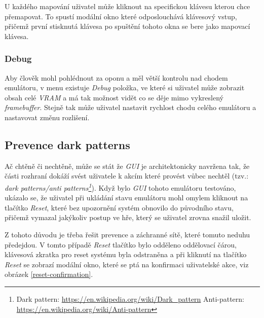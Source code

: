 U každého mapování uživatel může kliknout na specifickou klávesu kterou chce přemapovat.
To spustí modální okno které odposlouchává klávesový vstup, přičemž první stisknutá klávesa
po spuštění tohoto okna se bere jako mapovací klávesa. 

\subsubsection{Debug}

Aby člověk mohl pohlédnout za oponu a měl větší kontrolu nad chodem emulátoru, v menu existuje \textit{Debug} položka, ve které
si uživatel může zobrazit obsah celé \textit{VRAM} a má tak možnost vidět co se děje mimo vykreslený \textit{framebuffer}.
Stejně tak může uživatel nastavit rychlost chodu celého emulátoru a nastavovat změnu rozlišení.

\subsection{Prevence dark patterns}

Ač chtěně či nechtěně, může se stát že \textit{GUI} je architektonicky navržena tak, že části rozhraní dokáží svést uživatele k akcím
které provést vůbec nechtěl (tzv.: \textit{dark patterns/anti patterns\footnote{Dark pattern: \url{https://en.wikipedia.org/wiki/Dark_pattern} \newline Anti-pattern: \url{https://en.wikipedia.org/wiki/Anti-pattern}}}). Když bylo \textit{GUI} tohoto emulátoru testováno, ukázalo se, že uživatel při ukládání stavu emulátoru
mohl omylem kliknout na tlačítko \textit{Reset}, které bez upozornění systém obnovilo do původního stavu, přičemž vymazal jakýkoliv postup ve
hře, který se uživatel zrovna snažil uložit.

Z tohoto důvodu je třeba řešit prevence a záchranné sítě, které tomuto neduhu předejdou. V tomto případě \textit{Reset} tlačítko bylo odděleno oddělovací čárou,
klávesová zkratka pro reset systému byla odstraněna a při kliknutí na tlačítko \textit{Reset} se zobrazí modální okno, které se ptá na konfirmaci
uživatelské akce, viz obrázek \ref{reset-confirmation}.

